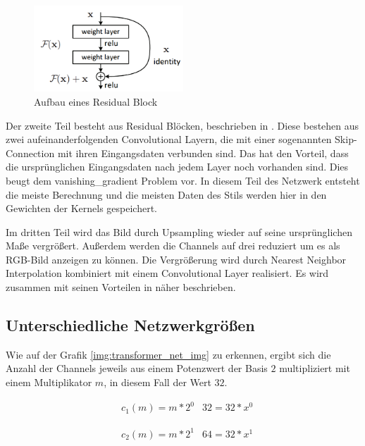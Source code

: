 \begin{figure}[H]
	\centering
	\includegraphics[width=0.50\textwidth]{resources/content/residual_block.png}
	\caption{Aufbau eines Residual Block \cite{residual_block_img}}
	\label{img:residual_block_img}
\end{figure}

Der zweite Teil besteht aus Residual Blöcken, beschrieben in \cite{DBLP:journals/corr/HeZRS15}. Diese bestehen aus zwei aufeinanderfolgenden Convolutional Layern, die mit einer sogenannten Skip-Connection mit ihren Eingangsdaten verbunden sind. Das hat den Vorteil, dass die ursprünglichen Eingangsdaten nach jedem Layer noch vorhanden sind. Dies beugt dem \gls{vanishing_gradient} Problem vor. In diesem Teil des Netzwerk entsteht die meiste Berechnung und die meisten Daten des Stils werden hier in den Gewichten der Kernels gespeichert.

Im dritten Teil wird das Bild durch Upsampling wieder auf seine ursprünglichen Maße vergrößert. Außerdem werden die Channels auf drei reduziert um es als RGB-Bild anzeigen zu können. Die Vergrößerung wird durch Nearest Neighbor Interpolation kombiniert mit einem Convolutional Layer realisiert.
Es wird zusammen mit seinen Vorteilen in \cite{odena2016deconvolution} näher beschrieben.

\pagebreak

\subsection{Unterschiedliche Netzwerkgrößen}

Wie auf der Grafik \ref{img:transformer_net_img} zu erkennen, ergibt sich die Anzahl der Channels jeweils aus einem Potenzwert der Basis $ 2 $ multipliziert mit einem Multiplikator $ m $, in diesem Fall der Wert $ 32 $.

\begin{align}
	& c_{1}(m) = m * 2^{0}
	& 32 = 32 * x^{0}
\end{align}

\begin{align}
	& c_{2}(m) = m * 2^{1}
	& 64 = 32 * x^{1}
\end{align}

